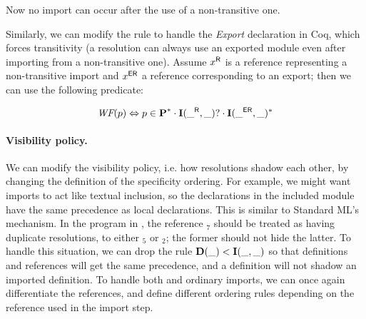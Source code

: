 \noindent Now no import can occur after the use of a non-transitive one.

Similarly, we can modify the rule to handle the \emph{Export} declaration in 
Coq, which forces transitivity (a resolution can always use an exported module
even after importing from a non-transitive one).
Assume ${x}^{\mbox{\scriptsize\sf R}}$ is a reference representing a non-transitive import and
${x}^{\mbox{\scriptsize\sf ER}}$ a reference corresponding to an export; then we can use the
following predicate:

\vspace*{-0.4\baselineskip}
$$ \WF(p) \Leftrightarrow p \in \pstep^* \cdot \istep{\r{\_}}{\_}? \cdot
\istep{\er{\_}}{\_}^*\vspace*{-0.4\baselineskip}
 $$


\paragraph{Visibility policy.}

We can modify the visibility policy, i.e. how
resolutions shadow each other, by changing the definition of the specificity ordering.
For example, we might want imports to 
act like textual inclusion, so the declarations in the included module have 
the same precedence as local declarations. This is similar to Standard ML's 
mechanism.
In the program in , the reference $_7$ should be treated
as having duplicate resolutions, to either $_5$ or $_2$;
the former should not hide the latter.
To handle this situation, we can drop the rule
$\mbox{\rm\bf{D}}(\_) < \mbox{\rm\bf{I}}(\_,\_)$ so that definitions and references
will get the same precedence, and a definition will not shadow an imported
definition.
To handle both  and ordinary imports, we can once again differentiate
the references, and define different ordering rules depending on the reference used
in the import step.

